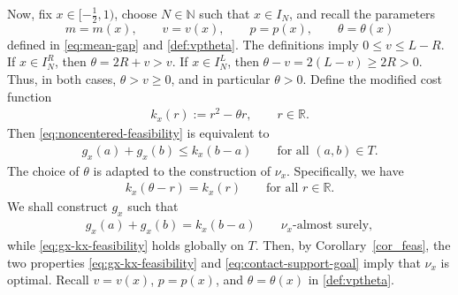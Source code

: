 \documentclass{article}
\newcommand{\R}{\mathbb{R}}
\begin{document}
Now, fix \(x\in[-\frac12,1)\), choose \(N\in\mathbb N\) such that \(x\in I_N\), and recall the parameters
\[
    m=m(x),\qquad
    v=v(x),\qquad
    p=p(x),\qquad
    \theta=\theta(x)
\]
defined in \eqref{eq:mean-gap} and \eqref{def:vptheta}.
The definitions imply \(0\leq v\leq L-R\).
If \(x\in I_N^R\), then \(\theta=2R+v>v\).
If \(x\in I_N^L\), then \(\theta-v=2(L-v)\geq2R>0\).
Thus, in both cases, \(\theta>v\geq0\), and in particular \(\theta>0\).
Define the modified cost function
\begin{align}\label{def:k_x}
    k_x(r):=r^2-\theta r,
    \qquad r\in \R.
\end{align}
Then \eqref{eq:noncentered-feasibility} is equivalent to
\begin{align}\label{eq:gx-kx-feasibility}
    g_x(a)+g_x(b)
    \leq k_x(b-a)
    \qquad\text{for all }(a,b)\in T.
\end{align}
The choice of \(\theta\) is adapted to the construction of \(\nu_x\).
Specifically, we have
\begin{align}\label{prop_kr}
    k_x(\theta-r)=k_x(r)
    \qquad\text{for all }r\in\mathbb R.
\end{align}
We shall construct \(g_x\) such that
\begin{align}\label{eq:contact-support-goal}
    g_x(a)+g_x(b)=k_x(b-a)
    \qquad
    \nu_x\text{-almost surely},
\end{align}
while \eqref{eq:gx-kx-feasibility} holds globally on \(T\).
Then, by Corollary~\ref{cor_feas}, the two properties \eqref{eq:gx-kx-feasibility} and \eqref{eq:contact-support-goal} imply that \(\nu_x\) is optimal.
Recall \(v= v(x)\), \(p=p(x)\), and \(\theta = \theta(x)\) in \eqref{def:vptheta}.
\end{document}
